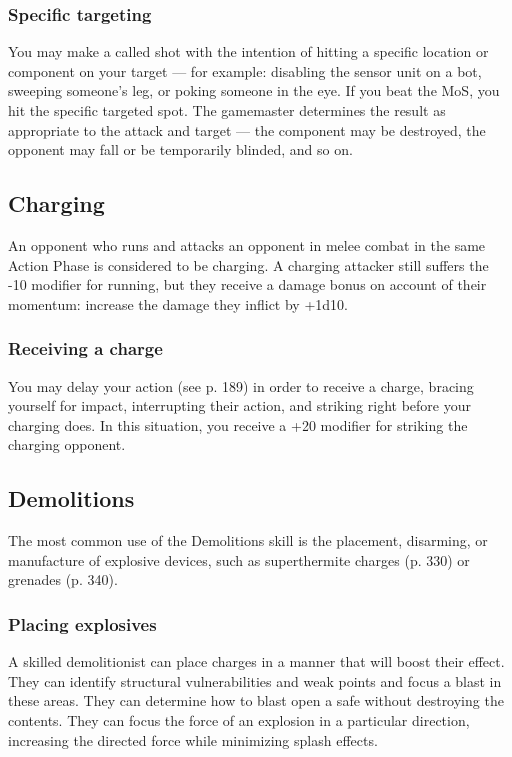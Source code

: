 \subsubsection{Specific targeting} 

You may make a called shot with the intention of hitting a specific location or component on your target --- for example: disabling the sensor unit on a bot, sweeping someone’s leg, or poking someone in the eye. If you beat the MoS, you hit the specific targeted spot. The gamemaster determines the result as appropriate to the attack and target --- the component may be destroyed, the opponent may fall or be temporarily blinded, and so on. 

\subsection{Charging} \label{sec:charging} 

An opponent who runs and attacks an opponent in melee combat in the same Action Phase is considered to be charging. A charging attacker still suffers the -10 modifier for running, but they receive a damage bonus on account of their momentum: increase the damage they inflict by +1d10. 

\subsubsection{Receiving a charge} 

You may delay your action (see p. 189) in order to receive a charge, bracing yourself for impact, interrupting their action, and striking right before your charging does. In this situation, you receive a +20 modifier for striking the charging opponent. 



\subsection{Demolitions} \label{sec:demolitions} 

The most common use of the Demolitions skill is the placement, disarming, or manufacture of explosive devices, such as superthermite charges (p. 330) or grenades (p. 340). 

\subsubsection{Placing explosives} 

A skilled demolitionist can place charges in a manner that will boost their effect. They can identify structural vulnerabilities and weak points and focus a blast in these areas. They can determine how to blast open a safe without destroying the contents. They can focus the force of an explosion in a particular direction, increasing the directed force while minimizing splash effects. 


